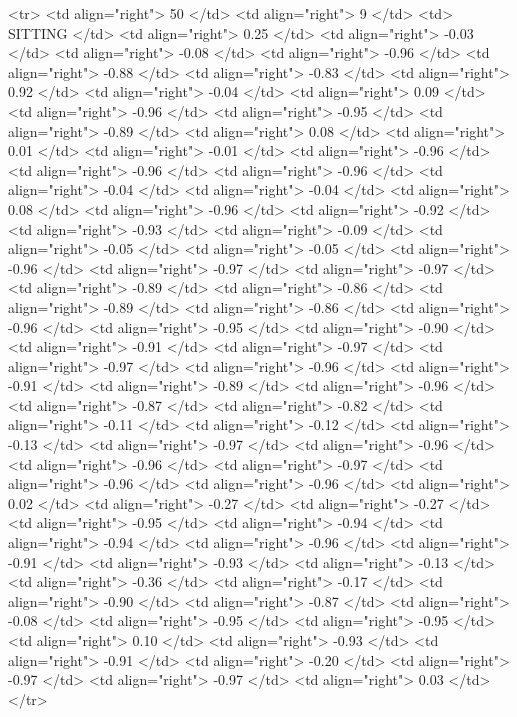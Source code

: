   <tr> <td align="right"> 50 </td> <td align="right">   9 </td> <td> SITTING </td> <td align="right"> 0.25 </td> <td align="right"> -0.03 </td> <td align="right"> -0.08 </td> <td align="right"> -0.96 </td> <td align="right"> -0.88 </td> <td align="right"> -0.83 </td> <td align="right"> 0.92 </td> <td align="right"> -0.04 </td> <td align="right"> 0.09 </td> <td align="right"> -0.96 </td> <td align="right"> -0.95 </td> <td align="right"> -0.89 </td> <td align="right"> 0.08 </td> <td align="right"> 0.01 </td> <td align="right"> -0.01 </td> <td align="right"> -0.96 </td> <td align="right"> -0.96 </td> <td align="right"> -0.96 </td> <td align="right"> -0.04 </td> <td align="right"> -0.04 </td> <td align="right"> 0.08 </td> <td align="right"> -0.96 </td> <td align="right"> -0.92 </td> <td align="right"> -0.93 </td> <td align="right"> -0.09 </td> <td align="right"> -0.05 </td> <td align="right"> -0.05 </td> <td align="right"> -0.96 </td> <td align="right"> -0.97 </td> <td align="right"> -0.97 </td> <td align="right"> -0.89 </td> <td align="right"> -0.86 </td> <td align="right"> -0.89 </td> <td align="right"> -0.86 </td> <td align="right"> -0.96 </td> <td align="right"> -0.95 </td> <td align="right"> -0.90 </td> <td align="right"> -0.91 </td> <td align="right"> -0.97 </td> <td align="right"> -0.97 </td> <td align="right"> -0.96 </td> <td align="right"> -0.91 </td> <td align="right"> -0.89 </td> <td align="right"> -0.96 </td> <td align="right"> -0.87 </td> <td align="right"> -0.82 </td> <td align="right"> -0.11 </td> <td align="right"> -0.12 </td> <td align="right"> -0.13 </td> <td align="right"> -0.97 </td> <td align="right"> -0.96 </td> <td align="right"> -0.96 </td> <td align="right"> -0.97 </td> <td align="right"> -0.96 </td> <td align="right"> -0.96 </td> <td align="right"> 0.02 </td> <td align="right"> -0.27 </td> <td align="right"> -0.27 </td> <td align="right"> -0.95 </td> <td align="right"> -0.94 </td> <td align="right"> -0.94 </td> <td align="right"> -0.96 </td> <td align="right"> -0.91 </td> <td align="right"> -0.93 </td> <td align="right"> -0.13 </td> <td align="right"> -0.36 </td> <td align="right"> -0.17 </td> <td align="right"> -0.90 </td> <td align="right"> -0.87 </td> <td align="right"> -0.08 </td> <td align="right"> -0.95 </td> <td align="right"> -0.95 </td> <td align="right"> 0.10 </td> <td align="right"> -0.93 </td> <td align="right"> -0.91 </td> <td align="right"> -0.20 </td> <td align="right"> -0.97 </td> <td align="right"> -0.97 </td> <td align="right"> 0.03 </td> </tr>
